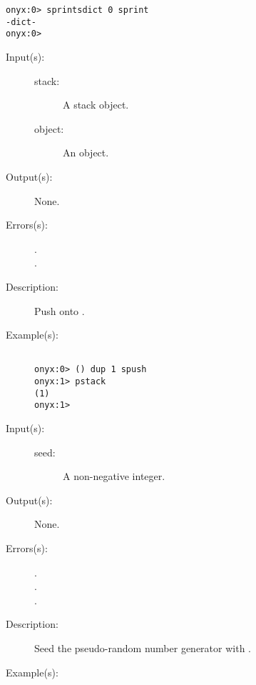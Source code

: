 \begin{description}
\begin{description}
\begin{verbatim}
onyx:0> sprintsdict 0 sprint
-dict-
onyx:0>
		\end{verbatim}
	\end{description}
\label{systemdict:spush}
\item[{\onyxop{stack object}{spush}{--}}: ]
	\begin{description}\item[]
	\item[Input(s): ]
		\begin{description}\item[]
		\item[stack: ]
			A stack object.
		\item[object: ]
			An object.
		\end{description}
	\item[Output(s): ] None.
	\item[Errors(s): ]
		\begin{description}\item[]
		\item[.]
		\item[.]
		\end{description}
	\item[Description: ]
		Push  onto .
	\item[Example(s): ]\begin{verbatim}

onyx:0> () dup 1 spush
onyx:1> pstack
(1)
onyx:1>
		\end{verbatim}
	\end{description}
\label{systemdict:srand}
\item[{\onyxop{seed}{srand}{--}}: ]
	\begin{description}\item[]
	\item[Input(s): ]
		\begin{description}\item[]
		\item[seed: ]
			A non-negative integer.
		\end{description}
	\item[Output(s): ] None.
	\item[Errors(s): ]
		\begin{description}\item[]
		\item[.]
		\item[.]
		\item[.]
		\end{description}
	\item[Description: ]
		Seed the pseudo-random number generator with .
	\item[Example(s): ]\begin{verbatim}


\end{verbatim}
\end{description}
\end{description}
